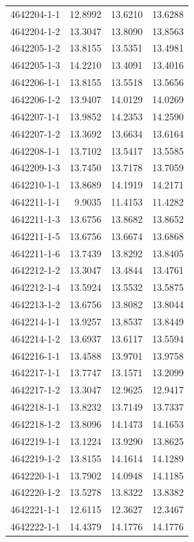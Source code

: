 \begin{longtable}{lrrr}
4642204-1-1 & 12.8992 & 13.6210 & 13.6288 \\
4642204-1-2 & 13.3047 & 13.8090 & 13.8563 \\
4642205-1-2 & 13.8155 & 13.5351 & 13.4981 \\
4642205-1-3 & 14.2210 & 13.4091 & 13.4016 \\
4642206-1-1 & 13.8155 & 13.5518 & 13.5656 \\
4642206-1-2 & 13.9407 & 14.0129 & 14.0269 \\
4642207-1-1 & 13.9852 & 14.2353 & 14.2590 \\
4642207-1-2 & 13.3692 & 13.6634 & 13.6164 \\
4642208-1-1 & 13.7102 & 13.5417 & 13.5585 \\
4642209-1-3 & 13.7450 & 13.7178 & 13.7059 \\
4642210-1-1 & 13.8689 & 14.1919 & 14.2171 \\
4642211-1-1 & 9.9035 & 11.4153 & 11.4282 \\
4642211-1-3 & 13.6756 & 13.8682 & 13.8652 \\
4642211-1-5 & 13.6756 & 13.6674 & 13.6868 \\
4642211-1-6 & 13.7439 & 13.8292 & 13.8405 \\
4642212-1-2 & 13.3047 & 13.4844 & 13.4761 \\
4642212-1-4 & 13.5924 & 13.5532 & 13.5875 \\
4642213-1-2 & 13.6756 & 13.8082 & 13.8044 \\
4642214-1-1 & 13.9257 & 13.8537 & 13.8449 \\
4642214-1-2 & 13.6937 & 13.6117 & 13.5594 \\
4642216-1-1 & 13.4588 & 13.9701 & 13.9758 \\
4642217-1-1 & 13.7747 & 13.1571 & 13.2099 \\
4642217-1-2 & 13.3047 & 12.9625 & 12.9417 \\
4642218-1-1 & 13.8232 & 13.7149 & 13.7337 \\
4642218-1-2 & 13.8096 & 14.1473 & 14.1653 \\
4642219-1-1 & 13.1224 & 13.9290 & 13.8625 \\
4642219-1-2 & 13.8155 & 14.1614 & 14.1289 \\
4642220-1-1 & 13.7902 & 14.0948 & 14.1185 \\
4642220-1-2 & 13.5278 & 13.8322 & 13.8382 \\
4642221-1-1 & 12.6115 & 12.3627 & 12.3467 \\
4642222-1-1 & 14.4379 & 14.1776 & 14.1776 \\

\end{longtable}
